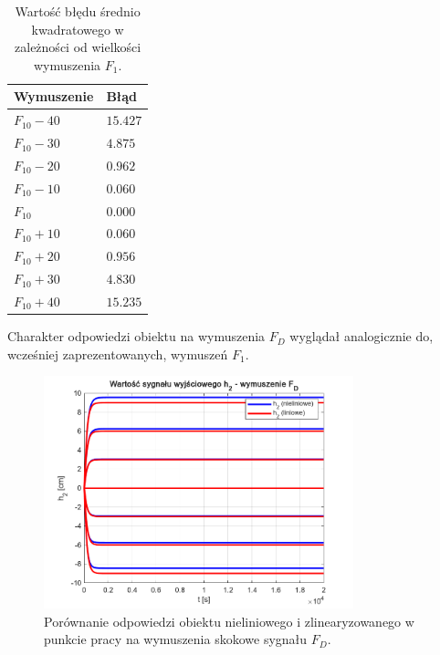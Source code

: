 \begin{table}[h!]
\centering
\renewcommand{\arraystretch}{1.2} %
\begin{tabular}{|>{\centering\arraybackslash}m{3cm}|>{\centering\arraybackslash}m{3cm}|}
\hline
Wymuszenie & Błąd \\ \hline
$F_{10} - 40$ & $\num{15.427}$ \\ \hline
$F_{10} - 30$ & $\num{4.875}$ \\ \hline
$F_{10} - 20$ & $\num{0.962}$ \\ \hline
$F_{10} - 10$ & $\num{0.060}$ \\ \hline
$F_{10}$ & $\num{0.000}$ \\ \hline
$F_{10} + 10$ & $\num{0.060}$ \\ \hline
$F_{10} + 20$ & $\num{0.956}$ \\ \hline
$F_{10} + 30$ & $\num{4.830}$ \\ \hline
$F_{10} + 40$ & $\num{15.235}$ \\ \hline
\end{tabular}
\caption{Wartość błędu średnio kwadratowego w zależności od wielkości wymuszenia $F_1$.}
\label{errors_F1}
\end{table}

\newpage

Charakter odpowiedzi obiektu na wymuszenia $F_D$ wyglądał analogicznie do, wcześniej zaprezentowanych, wymuszeń $F_1$.

\begin{figure}[h!]
\centering
\includegraphics[width=0.8\textwidth]{pictures/wymuszenie_FD}
\caption{Porównanie odpowiedzi obiektu nieliniowego i zlinearyzowanego w punkcie pracy na wymuszenia skokowe sygnału $F_D$.}
\end{figure}

